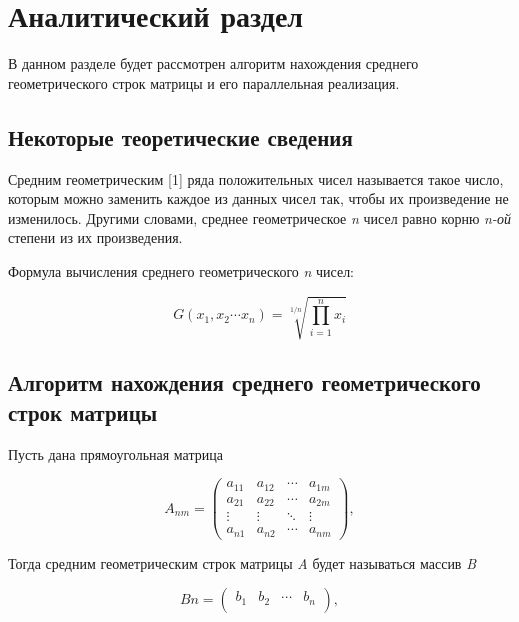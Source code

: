 \section{Аналитический раздел}

В данном разделе будет рассмотрен алгоритм нахождения среднего геометрического строк матрицы и его параллельная реализация.

\subsection{Некоторые теоретические сведения}

Средним геометрическим [1] ряда положительных чисел называется такое число, которым можно заменить каждое из данных чисел так, чтобы их произведение не изменилось. Другими словами, среднее геометрическое \textit{n} чисел равно корню \textit{n-ой} степени из их произведения.

Формула вычисления среднего геометрического \textit{n} чисел:

\begin{equation}
    \displaystyle
    G(x_{1}, x_{2} \cdots x_{n}) = \displaystyle\sqrt[1/n]{\prod_{i = 1}^{n} x_{i}}  
\end{equation}

\subsection{Алгоритм нахождения среднего геометрического строк матрицы}

Пусть дана прямоугольная матрица

\begin{equation}
    A_{nm} =
      \begin{pmatrix}
        a_{11} & a_{12} & \cdots & a_{1m} \\
        a_{21} & a_{22} & \cdots & a_{2m} \\
        \vdots & \vdots & \ddots & \vdots \\
        a_{n1} & a_{n2} & \cdots & a_{nm}
      \end{pmatrix},
\end{equation}

\vspace{5mm}

Тогда средним геометрическим строк матрицы \textit{A} будет называться массив \textit{B}

\begin{equation}
    B{n} =
    \begin{pmatrix}
      b_{1} & b_{2} & \cdots & b_{n} \\
    \end{pmatrix},
\end{equation}

